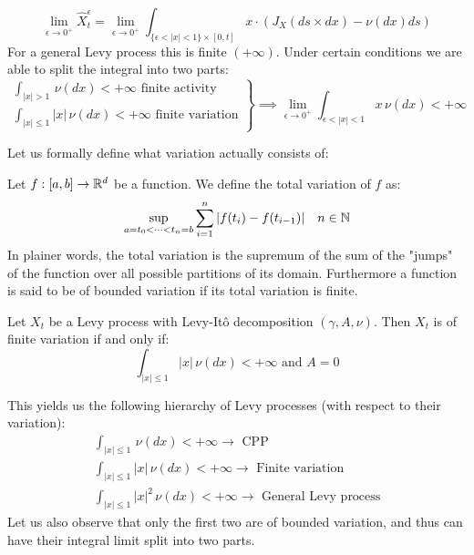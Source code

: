 \begin{property}
    \item \[ \lim_{\epsilon\to0^+} \hat{X}^\epsilon_t =
    \lim_{\epsilon\to0^+} \int_{\{\epsilon<|x|<1\} \times [0,t]} x \cdot
    \left( J_X(ds \times dx) - \nu(dx)ds \right) \]
    For a general Levy process this is finite $(+\infty)$. Under certain
    conditions we are able to split the integral into two parts:
    \[ \left. \begin{array}{l}
        \int_{|x|>1} \, \nu(dx) < +\infty \text{ finite activity} \\
        \int_{|x|\leq1} |x| \, \nu(dx) < +\infty \text{ finite variation}
    \end{array} \right\} \implies
        \lim_{\epsilon\to0^+} \int_{\epsilon<|x|<1} x \, \nu(dx) < +\infty
    \]
\end{property}

Let us formally define what variation actually consists of:

\begin{definition*}
    Let $f:[a,b]\to\mathbb{R}^d$ be a function. We define the total variation of $f$ as:
    \[ \sup_{a=t_0<\dots<t_n=b} \sum_{i=1}^n |f(t_i)-f(t_{i-1})| \quad n\in\mathbb{N}\]
    In plainer words, the total variation is the supremum of the sum of the
    "jumps" of the function over all possible partitions of its domain. 
    Furthermore a function is said to be of bounded variation if its total
    variation is finite.
\end{definition*}

\begin{theorem*}
    Let $X_t$ be a Levy process with Levy-Itô decomposition $(\gamma, A, \nu)$.
    Then $X_t$ is of finite variation if and only if:
    \[ \int_{|x|\leq1} |x| \, \nu(dx) < +\infty \text{ and } A = 0 \]
\end{theorem*}
This yields us the following hierarchy of Levy processes (with respect to their
variation):
\[ \begin{array}{l}
    \int_{|x|\leq1} \, \nu(dx) < +\infty \rightarrow \text{ CPP} \\
    \int_{|x|\leq1} |x| \, \nu(dx) < +\infty \rightarrow \text{ Finite variation} \\
    \int_{|x|\leq1} |x|^2 \, \nu(dx) < +\infty \rightarrow \text{ General Levy process}
\end{array} \]
Let us also observe that only the first two are of bounded variation, and thus
can have their integral limit split into two parts.
